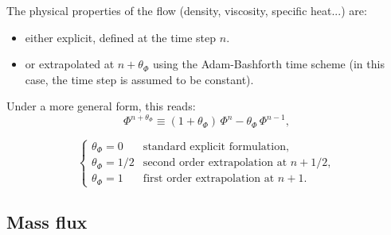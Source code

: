 The physical properties of the flow (density, viscosity, specific heat...)
are:

\begin{itemize}
\item either explicit, defined at the time step $n$.
\item or extrapolated at $n+\theta _{\Phi }$ using the Adam-Bashforth
time scheme (in this case, the time step is assumed to be constant).
\end{itemize}

Under a more general form, this reads:
\begin{equation}
 \Phi^{n+\theta_{\Phi}} \equiv(1+\theta_{\Phi})\,\Phi^{n}- \theta_{\Phi}\,\Phi^{n-1},
\end{equation}

\begin{equation}
\left\{%
\begin{array}{ll}
\theta_{\Phi} = 0 & \text{standard explicit formulation} ,\\
\theta_{\Phi} = 1/2 & \text{second order extrapolation at } n+1/2, \\
\theta_{\Phi} = 1 & \text{first order extrapolation at } n+1.
\end{array}
\right.
\end{equation}

\subsection{Mass flux}

\hypertarget{massflux}{}

